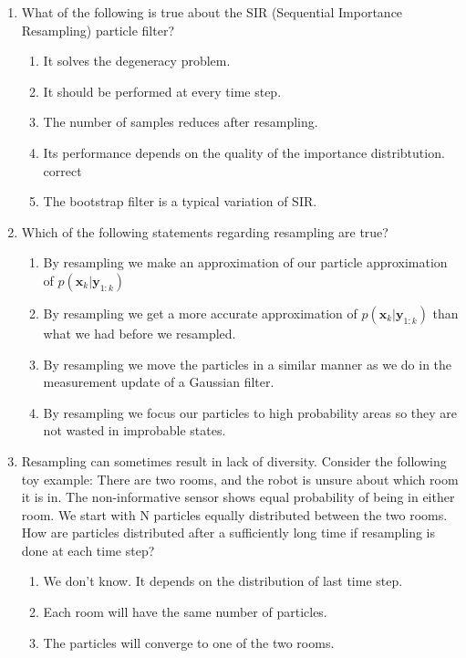 \begin{enumerate}
\item  What of the following is true about the SIR (Sequential Importance Resampling) particle filter?

\begin{enumerate}
\item It solves the degeneracy problem.
\item It should be performed at every time step. 
\item The number of samples reduces after resampling. 
\item Its performance depends on the quality of the importance distribtution. correct 
\item The bootstrap filter is a typical variation of SIR. 
\end{enumerate}

\item Which of the following statements regarding resampling are true?

\begin{enumerate}
\item By resampling we make an approximation of our particle approximation of $p(\mathbf{x}_k | \mathbf{y}_{1:k})$
\item By resampling we get a more accurate approximation of $p(\mathbf{x}_k | \mathbf{y}_{1:k})$ than what we had before we resampled.  
\item By resampling we move the particles in a similar manner as we do in the measurement update of a Gaussian filter. 
\item By resampling we focus our particles to high probability areas so they are not wasted in improbable states.  
\end{enumerate}

\item Resampling can sometimes result in lack of diversity.
Consider the following toy example: There are two rooms, and the robot is unsure about which room it is in. The non-informative sensor shows equal probability of being in either room. We start with N particles equally distributed between the two rooms. How are particles distributed after a sufficiently long time if resampling is done at each time step?

\begin{enumerate}
\item We don't know. It depends on the distribution of last time step. 
\item Each room will have the same number of particles. 
\item The particles will converge to one of the two rooms.   
\end{enumerate}

\end{enumerate}




